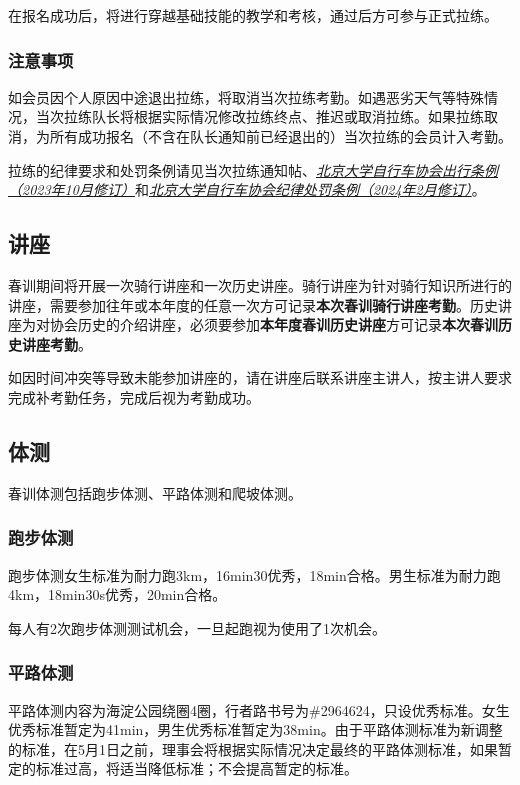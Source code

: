 \documentclass[UTF8]{ctexart}
\begin{document}
在报名成功后，将进行穿越基础技能的教学和考核，通过后方可参与正式拉练。

\subsubsection{注意事项}

如会员因个人原因中途退出拉练，将取消当次拉练考勤。如遇恶劣天气等特殊情况，当次拉练队长将根据实际情况修改拉练终点、推迟或取消拉练。如果拉练取消，为所有成功报名（不含在队长通知前已经退出的）当次拉练的会员计入考勤。


拉练的纪律要求和处罚条例请见当次拉练通知帖、\href{https://chexie.net/bbs/content/?bid=1&tid=9618&p=1}{\textit{北京大学自行车协会出行条例（2023年10月修订）}}和\href{https://chexie.net/bbs/content/?bid=1&tid=9751&p=1}{\textit{北京大学自行车协会纪律处罚条例（2024年2月修订）}}。

\subsection{讲座}


春训期间将开展一次骑行讲座和一次历史讲座。骑行讲座为针对骑行知识所进行的讲座，需要参加往年或本年度的任意一次方可记录\textbf{本次春训骑行讲座考勤}。历史讲座为对协会历史的介绍讲座，必须要参加\textbf{本年度春训历史讲座}方可记录\textbf{本次春训历史讲座考勤}。

如因时间冲突等导致未能参加讲座的，请在讲座后联系讲座主讲人，按主讲人要求完成补考勤任务，完成后视为考勤成功。

\subsection{体测}

春训体测包括跑步体测、平路体测和爬坡体测。

\subsubsection{跑步体测}

跑步体测女生标准为耐力跑3km，16min30优秀，18min合格。男生标准为耐力跑4km，18min30s优秀，20min合格。

每人有2次跑步体测测试机会，一旦起跑视为使用了1次机会。

\subsubsection{平路体测}

平路体测内容为海淀公园绕圈4圈，行者路书号为\#2964624，只设优秀标准。女生优秀标准暂定为41min，男生优秀标准暂定为38min。由于平路体测标准为新调整的标准，在5月1日之前，理事会将根据实际情况决定最终的平路体测标准，如果暂定的标准过高，将适当降低标准；不会提高暂定的标准。
\end{document}
